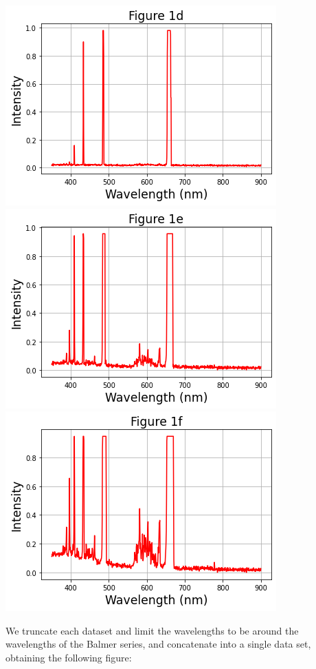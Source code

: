 \documentclass[11pt]{book}
\theoremstyle{break}
\theoremstyle{break}
\begin{document}
\begin{center}
\includegraphics[scale=0.55]{1d}
\includegraphics[scale=0.55]{1e}
\includegraphics[scale=0.55]{1f}
\end{center}
\newpage
We truncate each dataset and limit the wavelengths to be around the wavelengths of the Balmer series, and concatenate into a single data set, obtaining the following figure:
\end{document}
